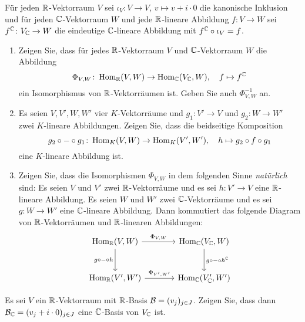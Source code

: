 \begin{question}
  Für jeden $\mathbb{R}$-Vektorraum $V$ sei $\iota_V \colon V \to V$, $v \mapsto v + i \cdot 0$ die kanonische Inklusion und für jeden $\mathbb{C}$-Vektorraum $W$ und jede $\mathbb{R}$-lineare Abbildung $f \colon V \to W$ sei $f^{\mathbb{C}} \colon V_{\mathbb{C}} \to W$ die eindeutige $\mathbb{C}$-lineare Abbildung mit $f^{\mathbb{C}} \circ \iota_V = f$.
  \begin{enumerate}[leftmargin=*]
    \item
      Zeigen Sie, dass für jedes $\mathbb{R}$-Vektorraum $V$ und $\mathbb{C}$-Vektorraum $W$ die Abbildung
      \[
        \Phi_{V,W} \colon \operatorname{Hom}_{\mathbb{R}}(V, W) \to \operatorname{Hom}_{\mathbb{C}}(V_{\mathbb{C}}, W),
        \quad
        f \mapsto f^{\mathbb{C}}
      \]
      ein Isomorphismus von $\mathbb{R}$-Vektorräumen ist.
      Geben Sie auch $\Phi_{V,W}^{-1}$ an.
    \item
      Es seien  $V, V', W, W'$ vier $K$-Vektorräume und $g_1 \colon V' \to V$ und $g_2 \colon W \to W'$ zwei $K$-lineare Abbildungen.
      Zeigen Sie, dass die beidseitige Komposition
      \[
        g_2 \circ - \circ g_1
        \colon
        \operatorname{Hom}_K(V, W) \to \operatorname{Hom}_K(V', W'),
        \quad
        h \mapsto g_2 \circ f \circ g_1
      \]
      eine $K$-lineare Abbildung ist.
    \item
      Zeigen Sie, dass die Isomorphismen $\Phi_{V,W}$ in dem folgenden Sinne \emph{natürlich} sind:
      Es seien $V$ und $V'$ zwei $\mathbb{R}$-Vektorräume und es sei $h \colon V' \to V$ eine $\mathbb{R}$-lineare Abbildung.
      Es seien $W$ und $W'$ zwei $\mathbb{C}$-Vektorräume und es sei $g \colon W \to W'$ eine $\mathbb{C}$-lineare Abbildung.
      Dann kommutiert das folgende Diagram von $\mathbb{R}$-Vektorräumen und $\mathbb{R}$-linearen Abbildungen:
      \[
        \begin{tikzcd}[row sep = large, column sep = large, ampersand replacement=\&]
                \Hom_\Rbb(V, W)         \arrow[swap]{d}{g \circ - \circ h}
                                        \arrow{r}{\Phi_{V,W}}
            \&  \Hom_\Cbb(V_\Cbb, W)    \arrow{d}{g \circ - \circ h^\Cbb}
          \\
                \Hom_\Rbb(V', W')       \arrow{r}{\Phi_{V',W'}}
            \&  \Hom_\Cbb(V'_\Cbb, W')
        \end{tikzcd}
      \]

  \end{enumerate}
\end{question}


\begin{question}
  Es sei $V$ ein $\mathbb{R}$-Vektorraum mit $\mathbb{R}$-Basis $\mathcal{B} = (v_j)_{j \in J}$.
  Zeigen Sie, dass dann $\mathcal{B}_{\mathbb{C}} = (v_j + i \cdot 0)_{j \in J}$ eine $\mathbb{C}$-Basis von $V_{\mathbb{C}}$ ist.
\end{question}


